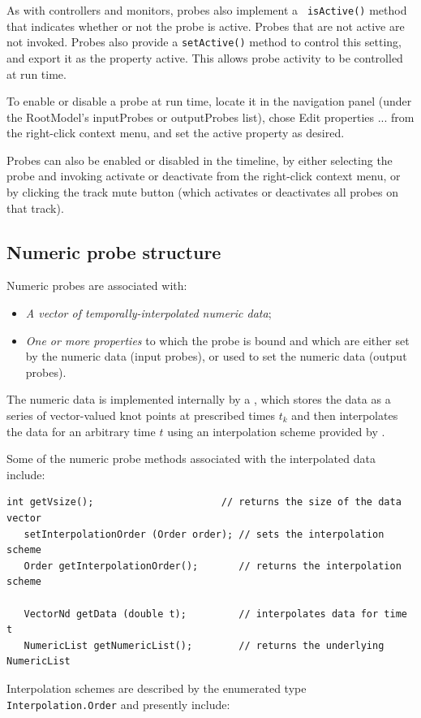 As with controllers and monitors, probes also implement a {\tt
isActive()} method that indicates whether or not the probe is active.
Probes that are not active are not invoked. Probes also provide a
{\tt setActive()} method to control this setting, and export it as the
property {\sf active}. This allows probe activity to be controlled at
run time.

\begin{sideblock}
To enable or disable a probe at run time, locate it in the navigation
panel (under the RootModel's {\sf inputProbes} or {\sf outputProbes}
list), chose {\sf Edit properties ...} from the right-click context
menu, and set the {\sf active} property as desired.

Probes can also be enabled or disabled in the timeline, by either
selecting the probe and invoking {\sf activate} or {\sf deactivate}
from the right-click context menu, or by clicking the track {\sf mute}
button (which activates or deactivates all probes on that track).
\end{sideblock}

\subsection{Numeric probe structure}
\label{NumericProbeStructure:sec}

Numeric probes are associated with:

\begin{itemize}

\item {\it A vector of temporally-interpolated numeric data};

\item {\it One or more properties} to which the probe is bound and
which are either set by the numeric data (input probes), or used to
set the numeric data (output probes).

\end{itemize}

The numeric data is implemented internally by a
, which stores the data
as a series of vector-valued knot points at prescribed times $t_k$ and
then interpolates the data for an arbitrary time $t$ using an
interpolation scheme provided by
.

Some of the numeric probe methods associated with the interpolated
data include:
\begin{lstlisting}[]
   int getVsize();                      // returns the size of the data vector
   setInterpolationOrder (Order order); // sets the interpolation scheme
   Order getInterpolationOrder();       // returns the interpolation scheme

   VectorNd getData (double t);         // interpolates data for time t
   NumericList getNumericList();        // returns the underlying NumericList
\end{lstlisting}
%
Interpolation schemes are described by the enumerated type {\tt
Interpolation.Order} and presently include:

